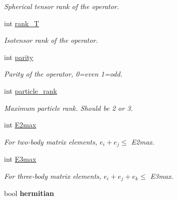 \begin{DoxyCompactItemize}
\begin{DoxyCompactList}\small\item\em Spherical tensor rank of the operator. \end{DoxyCompactList}\item 
\hypertarget{classOperator_ac70ee8dbbc4cb4f61972575c68bb9a51}{int \hyperlink{classOperator_ac70ee8dbbc4cb4f61972575c68bb9a51}{rank\-\_\-\-T}}\label{classOperator_ac70ee8dbbc4cb4f61972575c68bb9a51}

\begin{DoxyCompactList}\small\item\em Isotensor rank of the operator. \end{DoxyCompactList}\item 
\hypertarget{classOperator_ad628e91e2dd2542c0f34e985271adcd3}{int \hyperlink{classOperator_ad628e91e2dd2542c0f34e985271adcd3}{parity}}\label{classOperator_ad628e91e2dd2542c0f34e985271adcd3}

\begin{DoxyCompactList}\small\item\em Parity of the operator, 0=even 1=odd. \end{DoxyCompactList}\item 
\hypertarget{classOperator_a44a74c03caff49e776433e885a724956}{int \hyperlink{classOperator_a44a74c03caff49e776433e885a724956}{particle\-\_\-rank}}\label{classOperator_a44a74c03caff49e776433e885a724956}

\begin{DoxyCompactList}\small\item\em Maximum particle rank. Should be 2 or 3. \end{DoxyCompactList}\item 
\hypertarget{classOperator_ace64ea3f299cfba00bc973e58ce03414}{int \hyperlink{classOperator_ace64ea3f299cfba00bc973e58ce03414}{E2max}}\label{classOperator_ace64ea3f299cfba00bc973e58ce03414}

\begin{DoxyCompactList}\small\item\em For two-\/body matrix elements, $ e_i + e_j \leq $ E2max. \end{DoxyCompactList}\item 
\hypertarget{classOperator_ad3ebb434f911b9cb7c54ca6990cdda8c}{int \hyperlink{classOperator_ad3ebb434f911b9cb7c54ca6990cdda8c}{E3max}}\label{classOperator_ad3ebb434f911b9cb7c54ca6990cdda8c}

\begin{DoxyCompactList}\small\item\em For three-\/body matrix elements, $ e_i + e_j + e_k \leq $ E3max. \end{DoxyCompactList}\item 
\hypertarget{classOperator_ad46a54204c51cf5c82e4c489217bd2c1}{bool {\bfseries hermitian}}\label{classOperator_ad46a54204c51cf5c82e4c489217bd2c1}


\end{DoxyCompactItemize}
